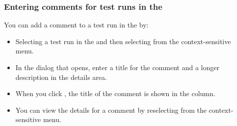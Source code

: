 \subsubsection{Entering comments for test runs in the \gdtestsummaryview}
\label{TestSummaryComments}
You can add a comment to a test run in the \gdtestsummaryview{} by:
\begin{itemize}
\item  Selecting a test run in the \gdtestsummaryview{} and then selecting  from the context-sensitive menu.
\item In the dialog that opens, enter a title for the comment and a longer description in the details area. 
\item When you click , the title of the comment is shown in the  column. 
\item You can view the  details for a comment by reselecting  from the context-sensitive menu.
\end{itemize}
